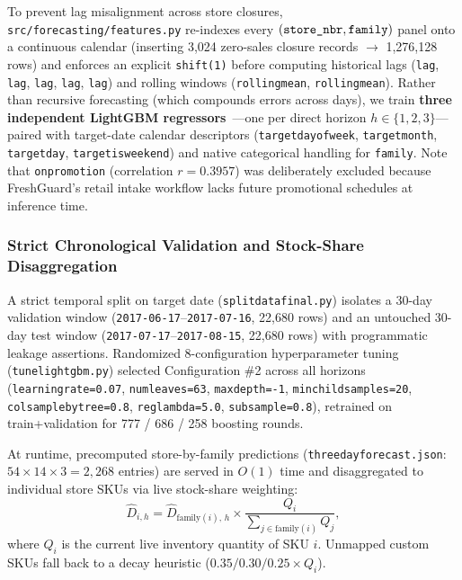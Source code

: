 \documentclass[11pt,a4paper]{article}
\renewcommand{\_}{\oldunderscore\allowbreak}
\begin{document}
To prevent lag misalignment across store closures, \texttt{src/forecasting/features.py} re-indexes every $(\texttt{store\_nbr}, \texttt{family})$ panel onto a continuous calendar (inserting 3,024 zero-sales closure records $\to$ 1,276,128 rows) and enforces an explicit \texttt{shift(1)} before computing historical lags (\texttt{lag\_1}, \texttt{lag\_2}, \texttt{lag\_3}, \texttt{lag\_7}, \texttt{lag\_14}) and rolling windows (\texttt{rolling\_mean\_7}, \texttt{rolling\_mean\_14}). Rather than recursive forecasting (which compounds errors across days), we train \textbf{three independent LightGBM regressors}~\cite{ke2017lightgbm}---one per direct horizon $h \in \{1, 2, 3\}$---paired with target-date calendar descriptors (\texttt{target\_dayofweek}, \texttt{target\_month}, \texttt{target\_day}, \texttt{target\_is\_weekend}) and native categorical handling for \texttt{family}. Note that \texttt{onpromotion} (correlation $r=0.3957$) was deliberately excluded because FreshGuard's retail intake workflow lacks future promotional schedules at inference time.

\subsubsection{Strict Chronological Validation and Stock-Share Disaggregation}
A strict temporal split on target date (\texttt{split\_data\_final.py}) isolates a 30-day validation window (\texttt{2017-06-17}--\texttt{2017-07-16}, 22,680 rows) and an untouched 30-day test window (\texttt{2017-07-17}--\texttt{2017-08-15}, 22,680 rows) with programmatic leakage assertions. Randomized 8-configuration hyperparameter tuning (\texttt{tune\_lightgbm.py}) selected Configuration \#2 across all horizons (\texttt{learning\_rate=0.07}, \texttt{num\_leaves=63}, \texttt{max\_depth=-1}, \texttt{min\_child\_samples=20}, \texttt{colsample\_bytree=0.8}, \texttt{reg\_lambda=5.0}, \texttt{subsample=0.8}), retrained on train+validation for 777 / 686 / 258 boosting rounds.

At runtime, precomputed store-by-family predictions (\texttt{three\_day\_forecast.json}: $54 \times 14 \times 3 = 2{,}268$ entries) are served in $O(1)$ time and disaggregated to individual store SKUs via live stock-share weighting:
\begin{equation}
    \hat{D}_{i, h} = \hat{D}_{\text{family}(i),\, h} \times \frac{Q_i}{\sum_{j \in \text{family}(i)} Q_j},
\end{equation}
where $Q_i$ is the current live inventory quantity of SKU $i$. Unmapped custom SKUs fall back to a decay heuristic ($0.35 / 0.30 / 0.25 \times Q_i$).
\end{document}
